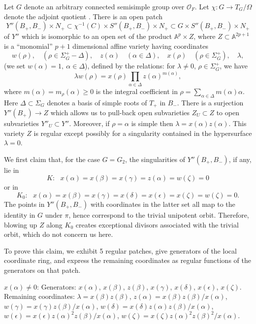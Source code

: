 \documentclass[12pt,letterpaper]{amsart}
\newcommand{\OF}{\mathcal{O}_F}
\newcommand{\aaa}{\mathbb{A}}
\begin{document}
Let $G$ denote an arbitrary connected semisimple group over $\OF$.
Let $\chi:G\rightarrow T_G/\Omega$ denote the adjoint quotient \cite{Sl80}.
There is an open patch
\[
Y''(B_+,B_-)\times N_+\subset
\chi^{-1}(C)\times S''(B_+,B_-)\times N_+
\subset G\times S''(B_+,B_-)\times N_+
\]
of $Y''$ which is isomorphic to an open set of the product
$\aaa^p\times Z$, where $Z\subset \aaa^{2p+1}$ is a
``monomial'' $p+1$ dimensional
affine variety having coordinates
\[
w(\rho),\quad (\rho\in \Sigma_G^+ -\Delta),\quad
z(\alpha)\quad (\alpha\in\Delta),\quad x(\rho)
\quad (\rho\in\Sigma_G^+),\quad \lambda,
\]
(we set $w(\alpha)=1,\ \alpha\in\Delta$), defined by the relations:
for $\lambda\not= 0$, $\rho\in\Sigma_G^+$, we have
\[
\lambda w(\rho )=x(\rho)\prod_{\alpha\in\Delta }z(\alpha )^{m(\alpha)},
\tag{3.1}
\]
where $m(\alpha)=m_\rho(\alpha)\geq 0$ is the integral coefficient in
$\rho = \sum_{\alpha\in\Delta }m(\alpha)\alpha $.
Here $\Delta\subset \Sigma_G$ denotes a basis of simple roots
of $T_+$ in $B_-$.
There is a surjection $Y''(B_+)\rightarrow Z$
which allows us to pull-back open subvarieties $Z_U\subset Z$ to open
subvarieties $Y''_U\subset Y''$.
Moreover,
if $\rho =\alpha$ is simple then $\lambda =x(\alpha)z(\alpha)$. This variety
$Z$ is regular except possibly for a singularity contained
in the hypersurface $\lambda =0$.

We first claim that, for the case $G=G_2$,
the singularities of $Y''(B_+,B_-)$, if any, lie in
\[
K:\ \ \ x(\alpha)=x(\beta)=x(\gamma)=z(\alpha)=w(\zeta)=0
\]
or in
\[
K_0:\ \ \ x(\alpha)=x(\beta)=x(\gamma)=x(\delta)=x(\epsilon)=x(\zeta)=w(\zeta)=0.
\]
The points in $Y''(B_+,B_-)$ with coordinates in the latter set all map to the
identity in $G$ under $\pi$, hence correspond to the trivial unipotent orbit.
Therefore, blowing up $Z$ along $K_0$ creates exceptional divisors
associated with the trivial orbit, which do not concern us here.

To prove this claim, we exhibit 5 regular patches, give generators of the
local coordinate ring, and express the remaining coordinates as regular
functions of the generators on that patch.

\medskip
\noindent
$x(\alpha)\not= 0$: Generators: $x(\alpha)$, $x(\beta)$, $z(\beta)$, $x(\gamma)$, $x(\delta)$, $x(\epsilon)$, $x(\zeta)$. Remaining coordinates:
$\lambda=x(\beta)z(\beta)$, $z(\alpha)=x(\beta)z(\beta)/x(\alpha)$,
$w(\gamma)=x(\gamma)z(\beta)/x(\alpha)$,
$w(\delta)=x(\delta)z(\alpha)z(\beta)/x(\alpha)$,
$w(\epsilon)=x(\epsilon)z(\alpha)^2 z(\beta)/x(\alpha)$,
$w(\zeta)=x(\zeta)z(\alpha)^2 z(\beta)^2 /x(\alpha)$.
\end{document}
